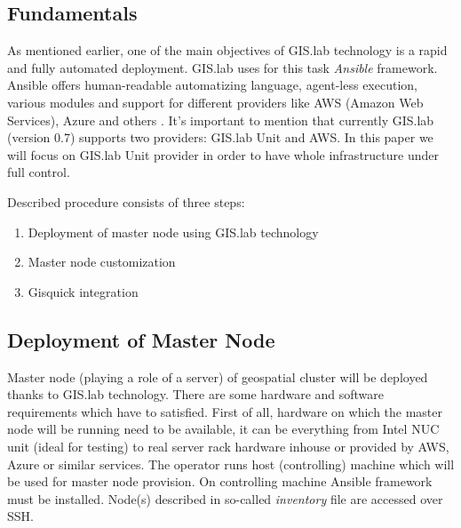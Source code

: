 \documentclass{isprs}
\begin{document}
\subsection{Fundamentals}

As mentioned earlier, one of the main objectives of GIS.lab technology
is a rapid and fully automated deployment. GIS.lab uses for this task
\textit{Ansible} framework. Ansible offers human-readable automatizing
language, agent-less execution, various modules and support for
different providers like AWS (Amazon Web Services), Azure and others
\cite{hochstein2014ansible}. It's important to mention that currently
GIS.lab (version 0.7) supports two providers: GIS.lab Unit and AWS. In
this paper we will focus on GIS.lab Unit provider in order to have
whole infrastructure under full control.

Described procedure consists of three steps:

\begin{enumerate}
\setlength\itemsep{0em}\setlength\parskip{0em}\setlength\topsep{0em}\setlength\partopsep{0em}\setlength\parsep{0em}
\item{Deployment of master node using GIS.lab technology} 
\item{Master node customization}
\item{Gisquick integration}
\end{enumerate}

\subsection{Deployment of Master Node}\label{Deployment of Master Node}

Master node (playing a role of a server) of geospatial cluster will be
deployed thanks to GIS.lab technology. There are some hardware and
software requirements which have to satisfied. First of all, hardware
on which the master node will be running need to be available, it can
be everything from Intel NUC unit (ideal for testing) to real server
rack hardware inhouse or provided by AWS, Azure or similar
services. The operator runs host (controlling) machine which will be
used for master node provision. On controlling machine Ansible
framework must be installed. Node(s) described in so-called
\textit{inventory} file are accessed over SSH.
\end{document}
